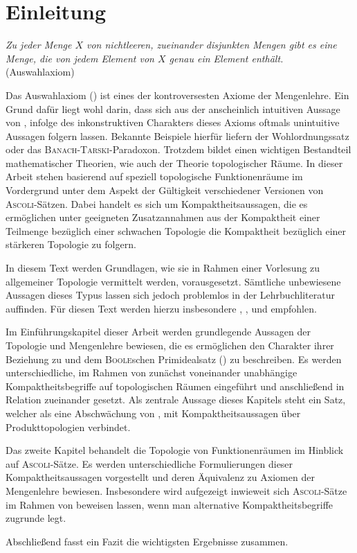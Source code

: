 \section*{Einleitung}

\begin{addmargin}[2em]{2em}%
  \textit{Zu jeder Menge $X$ von nichtleeren, zueinander disjunkten Mengen gibt es eine Menge, die von jedem Element von $X$ genau ein Element enthält.} 
  \flushright(Auswahlaxiom)
\end{addmargin}

Das Auswahlaxiom (\AC) ist eines der kontroversesten Axiome der Mengenlehre.
Ein Grund dafür liegt wohl darin, dass sich aus der anscheinlich intuitiven Aussage von \AC, infolge des inkonstruktiven Charakters dieses Axioms oftmals unintuitive Aussagen folgern lassen.
Bekannte Beispiele hierfür liefern der Wohlordnungssatz oder das \textsc{Banach}-\textsc{Tarski}-Paradoxon.
Trotzdem bildet \AC einen wichtigen Bestandteil mathematischer Theorien, wie auch der Theorie topologischer Räume.
In dieser Arbeit stehen basierend auf \cite{herrlich2006axiom} speziell topologische Funktionenräume im Vordergrund unter dem Aspekt der Gültigkeit verschiedener Versionen von \textsc{Ascoli}-Sätzen.
Dabei handelt es sich um Kompaktheitsaussagen, die es ermöglichen unter geeigneten Zusatzannahmen aus der Kompaktheit einer Teilmenge bezüglich einer schwachen Topologie die Kompaktheit bezüglich einer stärkeren Topologie zu folgern.

In diesem Text werden Grundlagen, wie sie in Rahmen einer Vorlesung zu allgemeiner Topologie vermittelt werden, vorausgesetzt.
Sämtliche unbewiesene Aussagen dieses Typus lassen sich jedoch problemlos in der Lehrbuchliteratur auffinden.
Für diesen Text werden hierzu insbesondere \cite{bartsch2015allgemeine}, \cite{ebbinghaus2003einfuhrung}, \cite{kelley1975general} und \cite{preuss1972topologische} empfohlen.

Im Einführungskapitel dieser Arbeit werden grundlegende Aussagen der Topologie und Mengenlehre bewiesen, die es ermöglichen den Charakter ihrer Beziehung zu \AC und dem \textsc{Boole}schen Primidealsatz (\PIT) zu beschreiben. 
Es werden unterschiedliche, im Rahmen von \ZF zunächst voneinander unabhängige Kompaktheitsbegriffe auf topologischen Räumen eingeführt und anschließend in Relation zueinander gesetzt.
Als zentrale Aussage dieses Kapitels steht ein Satz, welcher \PIT als eine Abschwächung von \AC, mit Kompaktheitsaussagen über Produkttopologien verbindet.

Das zweite Kapitel behandelt die Topologie von Funktionenräumen im Hinblick auf \textsc{Ascoli}-Sätze.
Es werden unterschiedliche Formulierungen dieser Kompaktheitsaussagen vorgestellt und deren Äquivalenz zu Axiomen der Mengenlehre bewiesen.
Insbesondere wird aufgezeigt inwieweit sich \textsc{Ascoli}-Sätze im Rahmen von \ZF beweisen lassen, wenn man alternative Kompaktheitsbegriffe zugrunde legt.

Abschließend fasst ein Fazit die wichtigsten Ergebnisse zusammen. 

\lie
